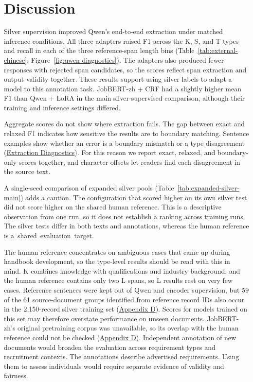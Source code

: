 \section{Discussion}
\label{sec:discussion}

Silver supervision improved Qwen's end-to-end extraction under matched inference conditions. All three adapters raised F1 across the K, S, and T types and recall in each of the three reference-span length bins (Table~\ref{tab:external-chinese}; Figure~\ref{fig:qwen-diagnostics}). The adapters also produced fewer responses with rejected span candidates, so the scores reflect span extraction and output validity together. These results support using silver labels to adapt a model to this annotation task. JobBERT-zh + CRF had a slightly higher mean F1 than Qwen + LoRA in the main silver-supervised comparison, although their training and inference settings differed.

Aggregate scores do not show where extraction fails. The gap between exact and relaxed F1 indicates how sensitive the results are to boundary matching. Sentence examples show whether an error is a boundary mismatch or a type disagreement (\hyperref[sec:extraction-diagnostics]{Extraction Diagnostics}). For this reason we report exact, relaxed, and boundary-only scores together, and character offsets let readers find each disagreement in the source text.

A single-seed comparison of expanded silver pools (Table~\ref{tab:expanded-silver-main}) adds a caution. The configuration that scored higher on its own silver test did not score higher on the shared human reference. This is a descriptive observation from one run, so it does not establish a ranking across training runs. The silver tests differ in both texts and annotations, whereas the human reference is \mbox{a shared evaluation target.}

The human reference concentrates on ambiguous cases that came up during handbook development, so the type-level results should be read with this in mind. K combines knowledge with qualifications and industry background, and the human reference contains only two L spans, so L results rest on very few cases. Reference sentences were kept out of Qwen and encoder supervision, but 59 of the 61 source-document groups identified from reference record IDs also occur in the 2,150-record silver training set (\hyperref[app:d]{Appendix D}). Scores for models trained on this set may therefore overstate performance on unseen documents. JobBERT-zh's original pretraining corpus was unavailable, so its overlap with the human reference could not be checked (\hyperref[app:d]{Appendix D}). Independent annotation of new documents would broaden the evaluation across requirement types and recruitment contexts. The annotations describe advertised requirements. Using them to assess individuals would require separate evidence of validity and fairness.

